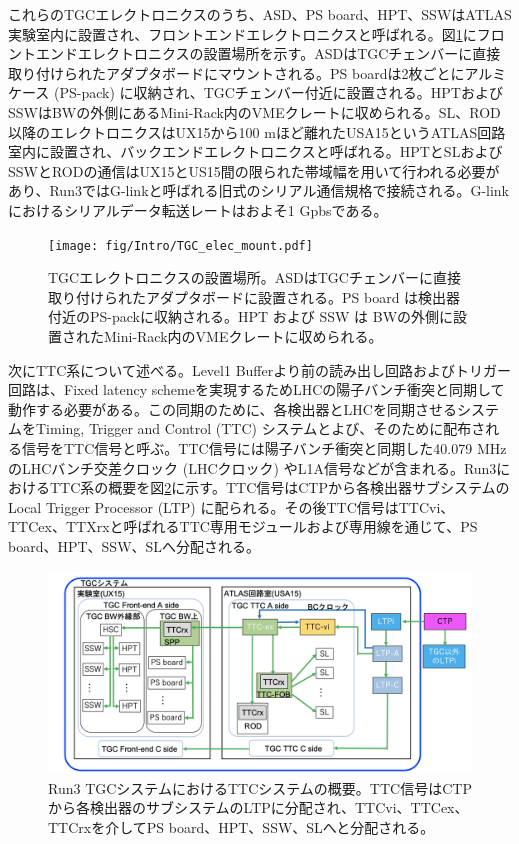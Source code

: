 これらのTGCエレクトロニクスのうち、ASD、PS board、HPT、SSWはATLAS実験室内に設置され、フロントエンドエレクトロニクスと呼ばれる。図\ref{TGC_elec_mount}にフロントエンドエレクトロニクスの設置場所を示す。ASDはTGCチェンバーに直接取り付けられたアダプタボードにマウントされる。PS boardは2枚ごとにアルミケース  (PS-pack) に収納され、TGCチェンバー付近に設置される。HPTおよびSSWはBWの外側にあるMini-Rack内のVMEクレートに収められる。SL、ROD以降のエレクトロニクスはUX15から100 mほど離れたUSA15というATLAS回路室内に設置され、バックエンドエレクトロニクスと呼ばれる。HPTとSLおよびSSWとRODの通信はUX15とUS15間の限られた帯域幅を用いて行われる必要があり、Run3ではG-linkと呼ばれる旧式のシリアル通信規格で接続される。G-linkにおけるシリアルデータ転送レートはおよそ1 Gpbsである。

\begin{figure} 
    \centering
    \texttt{[image: fig/Intro/TGC\_elec\_mount.pdf]}
    \caption[TGCエレクトロニクスが設置されている場所]{TGCエレクトロニクスの設置場所。ASDはTGCチェンバーに直接取り付けられたアダプタボードに設置される。PS board は検出器付近のPS-packに収納される。HPT および SSW は BWの外側に設置されたMini-Rack内のVMEクレートに収められる。}
    \label{TGC_elec_mount}
\end{figure}

次にTTC系について述べる。Level1 Bufferより前の読み出し回路およびトリガー回路は、Fixed latency schemeを実現するためLHCの陽子バンチ衝突と同期して動作する必要がある。この同期のために、各検出器とLHCを同期させるシステムをTiming, Trigger and Control  (TTC) システムとよび、そのために配布される信号をTTC信号と呼ぶ。TTC信号には陽子バンチ衝突と同期した40.079 MHzのLHCバンチ交差クロック  (LHCクロック) やL1A信号などが含まれる。Run3におけるTTC系の概要を図\ref{Run3_TTC}に示す。TTC信号はCTPから各検出器サブシステムのLocal Trigger Processor  (LTP) に配られる。その後TTC信号はTTCvi、TTCex、TTXrxと呼ばれるTTC専用モジュールおよび専用線を通じて、PS board、HPT、SSW、SLへ分配される。

\begin{figure} 
\centering
\includegraphics[width=16cm]{fig/Intro/Run3_TTC.png}
\caption[Run3 TGCシステムにおけるTTCシステムの概要]{Run3 TGCシステムにおけるTTCシステムの概要\cite{JINST:2008}。TTC信号はCTPから各検出器のサブシステムのLTPに分配され、TTCvi、TTCex、TTCrxを介してPS board、HPT、SSW、SLへと分配される。}
\label{Run3_TTC}
\end{figure}

